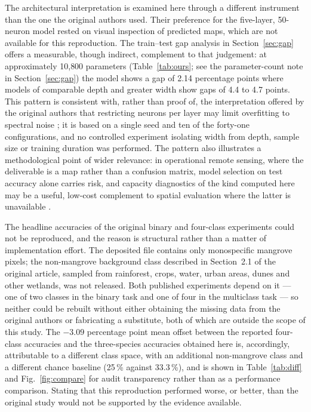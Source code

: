 \documentclass[10pt,twocolumn,a4paper]{article}
\begin{document}
The architectural interpretation is examined here through a different instrument than the one the
original authors used. Their preference for the five-layer, 50-neuron model rested on visual
inspection of predicted maps, which are not available for this reproduction. The train--test gap
analysis in Section~\ref{sec:gap} offers a measurable, though indirect, complement to that judgement: at
approximately 10{,}800 parameters (Table~\ref{tab:ours}; see the parameter-count note in
Section~\ref{sec:gap}) the model shows a gap of 2.14 percentage points where models of comparable depth and
greater width show gaps of 4.4 to 4.7 points. This pattern is consistent with, rather than proof of,
the interpretation offered by the original authors that restricting neurons per layer may limit
overfitting to spectral noise \citep{hagan2014}; it is based on a single seed and ten of the
forty-one configurations, and no controlled experiment isolating width from depth, sample size or
training duration was performed. The pattern also illustrates a methodological point of wider
relevance: in operational remote sensing, where the deliverable is a map rather than a confusion
matrix, model selection on test accuracy alone carries risk, and capacity diagnostics of the kind
computed here may be a useful, low-cost complement to spatial evaluation where the latter is
unavailable \citep{kumaraperumal2022,chowdhury2024}.

The headline accuracies of the original binary and four-class experiments could not be reproduced,
and the reason is structural rather than a matter of implementation effort. The deposited file
contains only monospecific mangrove pixels; the non-mangrove background class described in Section~2.1
of the original article, sampled from rainforest, crops, water, urban areas, dunes and other
wetlands, was not released. Both published experiments depend on it --- one of two classes in the
binary task and one of four in the multiclass task --- so neither could be rebuilt without either
obtaining the missing data from the original authors or fabricating a substitute, both of which are
outside the scope of this study. The $-3.09$ percentage point mean offset between the reported
four-class accuracies and the three-species accuracies obtained here is, accordingly, attributable
to a different class space, with an additional non-mangrove class and a different chance baseline
(25\,\% against 33.3\,\%), and is shown in Table~\ref{tab:diff} and Fig.~\ref{fig:compare} for
audit transparency rather than as a performance comparison. Stating that this reproduction performed
worse, or better, than the original study would not be supported by the evidence available.
\end{document}
